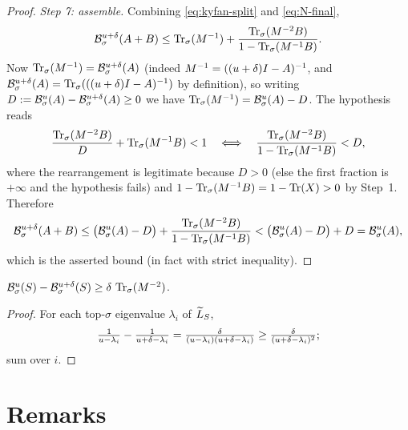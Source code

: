\begin{proof}
\medskip\noindent\emph{Step 7: assemble.}\quad
Combining \eqref{eq:kyfan-split} and \eqref{eq:N-final},
\[
  \mathcal{B}^{u+\delta}_{\sigma}(A+B)
   \le \operatorname{Tr}_{\sigma}(M^{-1})+\frac{\operatorname{Tr}_{\sigma}(M^{-2}B)}{1-\operatorname{Tr}_{\sigma}(M^{-1}B)} .
\]
Now $\operatorname{Tr}_{\sigma}(M^{-1})=\mathcal{B}^{u+\delta}_{\sigma}(A)$ (indeed
$M^{-1}=((u+\delta)I-A)^{-1}$, and $\mathcal{B}^{u+\delta}_{\sigma}(A)
=\operatorname{Tr}_{\sigma}(((u+\delta)I-A)^{-1})$ by definition), so writing
$D:=\mathcal{B}^{u}_{\sigma}(A)-\mathcal{B}^{u+\delta}_{\sigma}(A)\ge0$ we have
$\operatorname{Tr}_{\sigma}(M^{-1})=\mathcal{B}^{u}_{\sigma}(A)-D$. The hypothesis reads
\[
  \frac{\operatorname{Tr}_{\sigma}(M^{-2}B)}{D}+\operatorname{Tr}_{\sigma}(M^{-1}B)<1
  \quad\Longleftrightarrow\quad
  \frac{\operatorname{Tr}_{\sigma}(M^{-2}B)}{1-\operatorname{Tr}_{\sigma}(M^{-1}B)}<D ,
\]
where the rearrangement is legitimate because $D>0$ (else the first fraction is
$+\infty$ and the hypothesis fails) and $1-\operatorname{Tr}_{\sigma}(M^{-1}B)=1-\operatorname{Tr}(X)>0$ by
Step~1. Therefore
\[
  \mathcal{B}^{u+\delta}_{\sigma}(A+B)
   \le \bigl(\mathcal{B}^{u}_{\sigma}(A)-D\bigr)
       +\frac{\operatorname{Tr}_{\sigma}(M^{-2}B)}{1-\operatorname{Tr}_{\sigma}(M^{-1}B)}
   < \bigl(\mathcal{B}^{u}_{\sigma}(A)-D\bigr)+D
   = \mathcal{B}^{u}_{\sigma}(A),
\]
which is the asserted bound (in fact with strict inequality).
\end{proof}


\begin{qsixclaim}\label{cl:phi-diff}
$\mathcal{B}^{u}_{\sigma}(S)-\mathcal{B}^{u+\delta}_{\sigma}(S)\ge\delta\,\operatorname{Tr}_{\sigma}(M^{-2})$.
\end{qsixclaim}
\begin{proof}
For each top-$\sigma$ eigenvalue $\lambda_i$ of $\widetilde{L}_S$,
\[
  \tfrac{1}{u-\lambda_i}-\tfrac{1}{u+\delta-\lambda_i}
   = \tfrac{\delta}{(u-\lambda_i)(u+\delta-\lambda_i)}
   \ge \tfrac{\delta}{(u+\delta-\lambda_i)^2};
\]
sum over $i$.
\end{proof}

\section*{Remarks}

